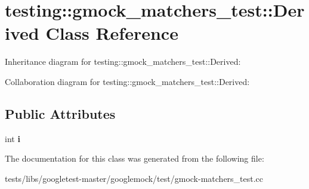\hypertarget{classtesting_1_1gmock__matchers__test_1_1Derived}{}\section{testing\+:\+:gmock\+\_\+matchers\+\_\+test\+:\+:Derived Class Reference}
\label{classtesting_1_1gmock__matchers__test_1_1Derived}


Inheritance diagram for testing\+:\+:gmock\+\_\+matchers\+\_\+test\+:\+:Derived\+:


Collaboration diagram for testing\+:\+:gmock\+\_\+matchers\+\_\+test\+:\+:Derived\+:
\subsection*{Public Attributes}
\begin{DoxyCompactItemize}
\item 
\mbox{\label{classtesting_1_1gmock__matchers__test_1_1Derived_a357d6747c44d7af7159fb5898a782f1b}} 
int {\bfseries i}
\end{DoxyCompactItemize}


The documentation for this class was generated from the following file\+:\begin{DoxyCompactItemize}
\item 
tests/libs/googletest-\/master/googlemock/test/gmock-\/matchers\+\_\+test.\+cc\end{DoxyCompactItemize}
